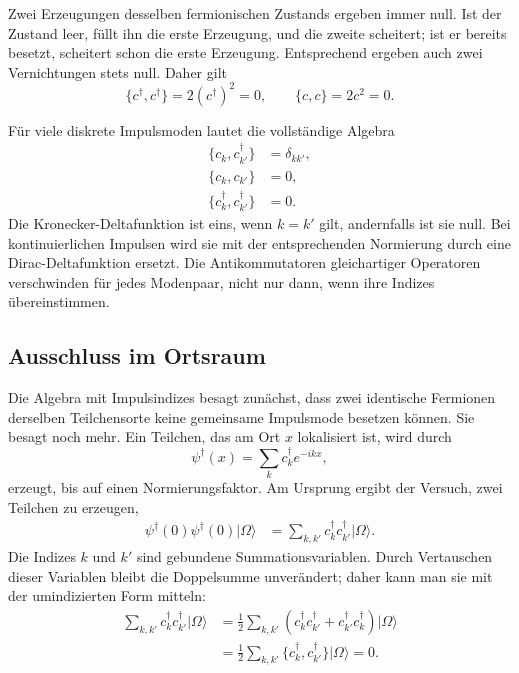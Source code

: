 Zwei Erzeugungen desselben fermionischen Zustands ergeben immer null. Ist der Zustand leer, füllt ihn die erste Erzeugung, und die zweite scheitert; ist er bereits besetzt, scheitert schon die erste Erzeugung. Entsprechend ergeben auch zwei Vernichtungen stets null. Daher gilt
\begin{equation}
\{c^\dagger,c^\dagger\}=2(c^\dagger)^2=0,
\qquad
\{c,c\}=2c^2=0.
\end{equation}

\begin{classroomqa}
\end{classroomqa}

Für viele diskrete Impulsmoden lautet die vollständige Algebra
\begin{align}
\{c_k,c_{k'}^\dagger\}&=\delta_{kk'},
\\
\{c_k,c_{k'}\}&=0,
\\
\{c_k^\dagger,c_{k'}^\dagger\}&=0.
\end{align}
Die Kronecker-Deltafunktion ist eins, wenn \(k=k'\) gilt, andernfalls ist sie null. Bei kontinuierlichen Impulsen wird sie mit der entsprechenden Normierung durch eine Dirac-Deltafunktion ersetzt. Die Antikommutatoren gleichartiger Operatoren verschwinden für jedes Modenpaar, nicht nur dann, wenn ihre Indizes übereinstimmen.

\subsection{Ausschluss im Ortsraum}

Die Algebra mit Impulsindizes besagt zunächst, dass zwei identische Fermionen derselben Teilchensorte keine gemeinsame Impulsmode besetzen können. Sie besagt noch mehr. Ein Teilchen, das am Ort \(x\) lokalisiert ist, wird durch
\begin{equation}
\psi^\dagger(x)=\sum_k c_k^\dagger e^{-ikx},
\end{equation}
erzeugt, bis auf einen Normierungsfaktor. Am Ursprung ergibt der Versuch, zwei Teilchen zu erzeugen,
\begin{align}
\psi^\dagger(0)\psi^\dagger(0)|\Omega\rangle
&=\sum_{k,k'}c_k^\dagger c_{k'}^\dagger|\Omega\rangle.
\end{align}
Die Indizes \(k\) und \(k'\) sind gebundene Summationsvariablen. Durch Vertauschen dieser Variablen bleibt die Doppelsumme unverändert; daher kann man sie mit der umindizierten Form mitteln:
\begin{align}
\sum_{k,k'}c_k^\dagger c_{k'}^\dagger|\Omega\rangle
&=\frac12\sum_{k,k'}
\left(c_k^\dagger c_{k'}^\dagger
+c_{k'}^\dagger c_k^\dagger\right)|\Omega\rangle
\\
&=\frac12\sum_{k,k'}
\{c_k^\dagger,c_{k'}^\dagger\}|\Omega\rangle
=0.
\end{align}

